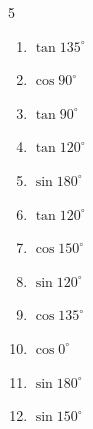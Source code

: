 


\setcounter{quesnum}{75}

\begin{multicols}{5}
\begin{enumerate}
  \itemsep=7pt
  \item $\displaystyle \tan{135^\circ}$

        \phantom{$\displaystyle =-1$}

  \item $\displaystyle \cos{90^\circ}$

        \phantom{$\displaystyle =0$}

  \item $\displaystyle \tan{90^\circ}$

        \phantom{$\displaystyle なし$}

  \item $\displaystyle \tan{120^\circ}$


  \item $\displaystyle \sin{180^\circ}$

        \phantom{$\displaystyle =0$}

  \item $\displaystyle \tan{120^\circ}$


  \item $\displaystyle \cos{150^\circ}$


  \item $\displaystyle \sin{120^\circ}$


  \item $\displaystyle \cos{135^\circ}$


  \item $\displaystyle \cos{0^\circ}$

        \phantom{$\displaystyle =1$}

  \item $\displaystyle \sin{180^\circ}$

        \phantom{$\displaystyle =0$}

  \item $\displaystyle \sin{150^\circ}$


\end{enumerate}
\end{multicols}
